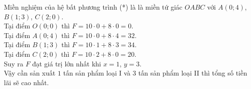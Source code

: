 \begin{bt}
{\begin{center}
\begin{tikzpicture}[>=stealth,line join=round, line cap=round, scale=0.7]
	\end{tikzpicture}
\end{center}
	Miền nghiệm của hệ bất phương trình (*) là là miền tứ giác $OABC$ với $A(0;4)$, $B(1;3)$, $C(2;0)$.\\
	Tại điểm $O(0;0)$ thì $F=10\cdot0+8\cdot0=0$.\\
	Tại điểm $A(0;4)$ thì $F=10\cdot0+8\cdot4=32$.\\
	Tại điểm $B(1;3)$ thì $F=10\cdot1+8\cdot3=34$.\\
	Tại điểm $C(2;0)$ thì $F=10\cdot2+8\cdot0=20$.\\
	Suy ra $F$ đạt giá trị lớn nhất khi $x=1$, $y=3$.\\
	Vậy cần sản xuất $1$ tấn sản phẩm loại I và $3$ tấn sản phẩm loại II thì tổng số tiền lãi sẽ cao nhất.
}
\end{bt}